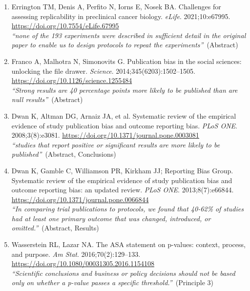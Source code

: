\documentclass[12pt]{article}
\begin{document}
\vspace{12pt}
{\fontsize{10.5}{13.5}\selectfont\setlength{\parskip}{0pt}
\par\vspace{4pt}
\begin{enumerate}[leftmargin=1.8em,itemsep=5pt,topsep=0pt,label=\arabic*.]
\item \hypertarget{ref-errington2021}{}Errington TM, Denis A, Perfito N, Iorns E, Nosek BA. Challenges for assessing replicability in preclinical cancer biology. \textit{eLife}. 2021;10:e67995. \url{https://doi.org/10.7554/eLife.67995}\\[1pt]{\color{quote}\itshape ``none of the 193 experiments were described in sufficient detail in the original paper to enable us to design protocols to repeat the experiments''}~{\color{quote}\footnotesize(Abstract)}
\item \hypertarget{ref-franco2014}{}Franco A, Malhotra N, Simonovits G. Publication bias in the social sciences: unlocking the file drawer. \textit{Science}. 2014;345(6203):1502--1505. \url{https://doi.org/10.1126/science.1255484}\\[1pt]{\color{quote}\itshape ``Strong results are 40 percentage points more likely to be published than are null results''}~{\color{quote}\footnotesize(Abstract)}
\item \hypertarget{ref-dwan2008}{}Dwan K, Altman DG, Arnaiz JA, et al. Systematic review of the empirical evidence of study publication bias and outcome reporting bias. \textit{PLoS ONE}. 2008;3(8):e3081. \url{https://doi.org/10.1371/journal.pone.0003081}\\[1pt]{\color{quote}\itshape ``studies that report positive or significant results are more likely to be published''}~{\color{quote}\footnotesize(Abstract, Conclusions)}
\item \hypertarget{ref-dwan2013}{}Dwan K, Gamble C, Williamson PR, Kirkham JJ; Reporting Bias Group. Systematic review of the empirical evidence of study publication bias and outcome reporting bias: an updated review. \textit{PLoS ONE}. 2013;8(7):e66844. \url{https://doi.org/10.1371/journal.pone.0066844}\\[1pt]{\color{quote}\itshape ``In comparing trial publications to protocols, we found that 40-62\% of studies had at least one primary outcome that was changed, introduced, or omitted.''}~{\color{quote}\footnotesize(Abstract, Results)}
\item \hypertarget{ref-asa2016}{}Wasserstein RL, Lazar NA. The ASA statement on p-values: context, process, and purpose. \textit{Am Stat}. 2016;70(2):129--133. \url{https://doi.org/10.1080/00031305.2016.1154108}\\[1pt]{\color{quote}\itshape ``Scientific conclusions and business or policy decisions should not be based only on whether a p-value passes a specific threshold.''}~{\color{quote}\footnotesize(Principle 3)}

\end{enumerate}}
\end{document}
